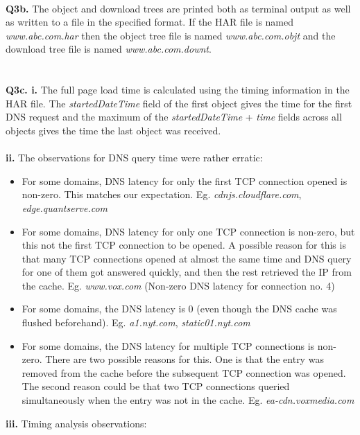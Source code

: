\documentclass[12pt]{article}
\begin{document}
~\\
{\bfseries Q3b.} The object and download trees are printed both as terminal output as well as written to a file in the specified format. If the HAR file is named \emph{www.abc.com.har} then the object tree file is named \emph{www.abc.com.objt} and the download tree file is named \emph{www.abc.com.downt}.
\\\\\\
{\bfseries Q3c. i.} The full page load time is calculated using the timing information in the HAR file. The \emph{startedDateTime} field of the first object gives the time for the first DNS request and the maximum of the \emph{startedDateTime} + \emph{time} fields across all objects gives the time the last object was received. \\\\
\textbf{ii.} The observations for DNS query time were rather erratic:
\begin{itemize}
\item For some domains, DNS latency for only the first TCP connection opened is non-zero. This matches our expectation. Eg. \emph{cdnjs.cloudflare.com}, \emph{edge.quantserve.com}
\item For some domains, DNS latency for only one TCP connection is non-zero, but this not the first TCP connection to be opened. A possible reason for this is that many TCP connections opened at almost the same time and DNS query for one of them got answered quickly, and then the rest retrieved the IP from the cache. Eg. \emph{www.vox.com} (Non-zero DNS latency for connection no. 4)
\item For some domains, the DNS latency is 0 (even though the DNS cache was flushed beforehand). Eg. \emph{a1.nyt.com}, \emph{static01.nyt.com} %
\item For some domains, the DNS latency for multiple TCP connections is non-zero. There are two possible reasons for this. One is that the entry was removed from the cache before the subsequent TCP connection was opened. The second reason could be that two TCP connections queried simultaneously when the entry was not in the cache. Eg. \emph{ea-cdn.voxmedia.com}
\end{itemize}
\textbf{iii.} Timing analysis observations:
\end{document}
